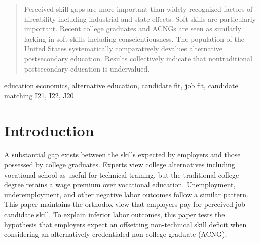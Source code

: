 \documentclass[review]{elsarticle}
\begin{document}
\begin{frontmatter}
\begin{abstract}
        Perceived skill gaps are more important than widely recognized factors of hireability including industrial and state effects.
        Soft skills are particularly important.
        Recent college graduates and ACNGs are seen as similarly lacking in soft skills including conscientiousness.
        The population of the United States systematically comparatively devalues alternative postsecondary education.
        Results collectively indicate that nontraditional postsecondary education is undervalued.
    \end{abstract}

    \begin{keyword}
        education economics, alternative education, candidate fit, job fit, candidate matching     %
        \MSC[2010] I21, I22, J20                                                                   %
    \end{keyword}

\end{frontmatter}

\pagebreak
\linenumbers

\section{Introduction}

A substantial gap exists between the skills expected by employers and those possessed by college graduates\cite{mcgarry2016examination, malik2017great, abbasi2018analysis, gingras2000there}.
Experts view college alternatives including vocational school as useful for technical training, but the traditional college degree retains a wage premium over vocational education.
Unemployment, underemployment, and other negative labor outcomes follow a similar pattern\cite{smith_2011}.
This paper maintains the orthodox view that employers pay for perceived job candidate skill.
To explain inferior labor outcomes,
this paper tests the hypothesis that employers expect an offsetting non-technical skill deficit when considering an alternatively credentialed non-college graduate (ACNG).
\end{document}
